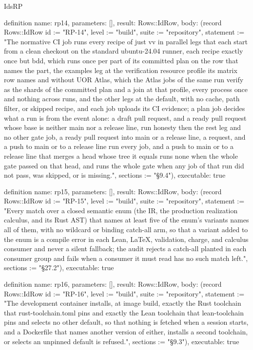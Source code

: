 \begin{lexlean}{IdsRP}
\begin{semanticmodule}
definition{
  name: rp14,
  parameters: [],
  result: Rows::IdRow,
  body: (record Rows::IdRow {id := "RP-14", level := "build", suite := "repository", statement := "The normative CI job runs every recipe of just vv in parallel legs that each start from a clean checkout on the standard ubuntu-24.04 runner, each recipe exactly once but bdd, which runs once per part of its committed plan on the row that names the part, the examples leg at the verification resource profile its matrix row names and without UOR Atlas, which the Atlas jobs of the same run verify as the shards of the committed plan and a join at that profile, every process once and nothing across runs, and the other legs at the default, with no cache, path filter, or skipped recipe, and each job uploads its CI evidence; a plan job decides what a run is from the event alone: a draft pull request, and a ready pull request whose base is neither main nor a release line, run honesty then the rest leg and no other gate job, a ready pull request into main or a release line, a request, and a push to main or to a release line run every job, and a push to main or to a release line that merges a head whose tree it equals runs none when the whole gate passed on that head, and runs the whole gate when any job of that run did not pass, was skipped, or is missing.", sections := "§9.4"}),
  executable: true
}

definition{
  name: rp15,
  parameters: [],
  result: Rows::IdRow,
  body: (record Rows::IdRow {id := "RP-15", level := "build", suite := "repository", statement := "Every match over a closed semantic enum (the IR, the production realization calculus, and its Rust AST) that names at least five of the enum's variants names all of them, with no wildcard or binding catch-all arm, so that a variant added to the enum is a compile error in each Lean, LaTeX, validation, charge, and calculus consumer and never a silent fallback; the audit rejects a catch-all planted in each consumer group and fails when a consumer it must read has no such match left.", sections := "§27.2"}),
  executable: true
}

definition{
  name: rp16,
  parameters: [],
  result: Rows::IdRow,
  body: (record Rows::IdRow {id := "RP-16", level := "build", suite := "repository", statement := "The development container installs, at image build, exactly the Rust toolchain that rust-toolchain.toml pins and exactly the Lean toolchain that lean-toolchain pins and selects no other default, so that nothing is fetched when a session starts, and a Dockerfile that names another version of either, installs a second toolchain, or selects an unpinned default is refused.", sections := "§9.3"}),
  executable: true
}


\end{semanticmodule}
\end{lexlean}
